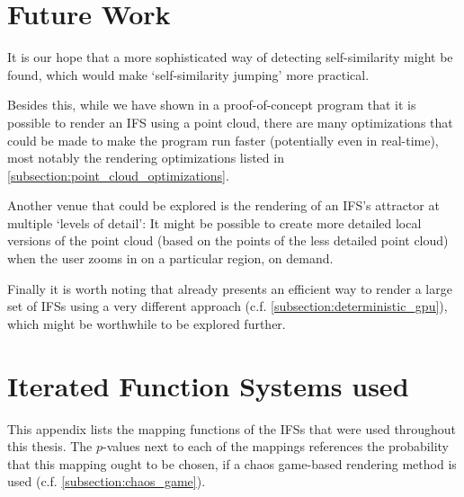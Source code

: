\documentclass[11pt]{article}
\begin{document}
\section{Future Work}
\label{sec:org0f8c541}
\label{section:further_work}

It is our hope that a more sophisticated way of detecting self-similarity might be found,
which would make `self-similarity jumping' more practical.

Besides this, while we have shown in a proof-of-concept program that it is possible to render an IFS using a point cloud,
there are many optimizations that could be made to make the program run faster (potentially even in real-time),
most notably the rendering optimizations listed in \autoref{subsection:point_cloud_optimizations}.

Another venue that could be explored is the rendering of an IFS's attractor at multiple `levels of detail':
It might be possible to create more detailed local versions of the point cloud (based on the points of the less detailed point cloud) when the user
zooms in on a particular region, on demand.

Finally it is worth noting that \cite{lawlor2012gpu} already presents an efficient way to render 
a large set of IFSs using a very different approach (c.f. \autoref{subsection:deterministic_gpu}), 
which might be worthwhile to be explored further.

\pagebreak
\printbibliography
\clearpage

\appendix

\section{Iterated Function Systems used}
\label{sec:org25f629d}

This appendix lists the mapping functions of the IFSs that were used throughout this thesis.
The \(p\)-values next to each of the mappings references the probability that this mapping ought to be chosen,
if a chaos game-based rendering method is used (c.f. \autoref{subsection:chaos_game}).

\end{document}

